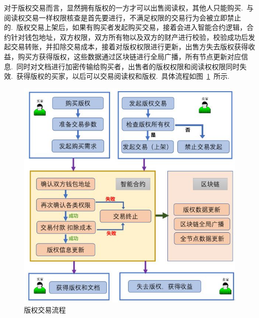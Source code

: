 \documentclass[a4paper,12pt,titlepage]{ctexart}
\begin{document}
对于版权交易而言，显然拥有版权的一方才可以出售阅读权，其他人只能购买.~与阅读权交易一样权限核查是首先要进行，不满足权限的交易行为会被立即禁止的.~版权交易上架后，如果有购买者发起购买交易，接着会进入智能合约逻辑，合约针对钱包地址，双方权限，双方所有物以及双方的财产进行校验，校验成功后发起交易转账，并扣除交易成本，接着对版权权限进行更新，出售方失去版权获得收益，购买方获得版权，这些数据通过区块链进行全局广播，所有节点更新对应信息.~同时对文档进行加密传输给购买者，出售者的版权权限和阅读权权限同时失效.~获得版权的买家，以后可以交易阅读权和版权.~具体流程如图~\ref{fig20}~所示.~\par
\begin{figure}[!hbp]
	\centering
	\includegraphics[scale=0.5]{fig20.jpg}
	\caption{版权交易流程}
	\label{fig20}
\end{figure}

\newpage
\end{document}
